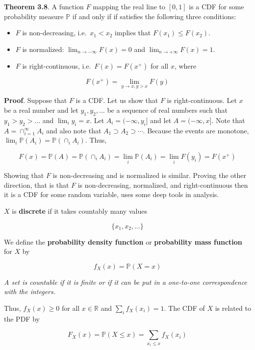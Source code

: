 \textbf{Theorem 3.8}. A function \(F\) mapping the real line to
\([0, 1]\) is a CDF for some probability measure \(\mathbb{P}\) if and
only if if satisfies the following three conditions:

\begin{itemize}[tightlist]
\item
  \(F\) is non-decreasing, i.e.~\(x_1 < x_2\) implies that
  \(F(x_1) \leq F(x_2)\).
\item
  \(F\) is normalized: \(\lim_{n \rightarrow -\infty} F(x) = 0\) and
  \(\lim_{n \rightarrow +\infty} F(x) = 1\).
\item
  \(F\) is right-continuous, i.e.~\(F(x) = F(x^+)\) for all \(x\), where
\end{itemize}

\[ F(x^+) = \lim_{y \rightarrow x, y > x} F(y) \]

\textbf{Proof}. Suppose that \(F\) is a CDF. Let us show that \(F\) is
right-continuous. Let \(x\) be a real number and let \(y_1, y_2, \dots\)
be a sequence of real numbers such that \(y_1 > y_2 > \dots\) and
\(\lim_i y_i = x\). Let \(A_i = (-\infty, y_i]\) and let
\(A = (-\infty, x]\). Note that \(A = \cap_{i=1}^\infty A_i\) and also
note that \(A_1 \supset A_2 \supset \cdots\). Because the events are
monotone, \(\lim_i \mathbb{P}(A_i) = \mathbb{P}(\cap_i A_i)\). Thus,

\[ F(x) = \mathbb{P}(A) = \mathbb{P}(\cap_i A_i) = \lim_i \mathbb{P}(A_i) = \lim_i F(y_i) = F(x^+) \]

Showing that \(F\) is non-decreasing and is normalized is similar.
Proving the other direction, that is that \(F\) is non-decreasing,
normalized, and right-continuous then it is a CDF for some random
variable, uses some deep tools in analysis.

\(X\) is \textbf{discrete} if it takes countably many values

\[ \{ x_1, x_2, \dots \} \]

We define the \textbf{probability density function} or
\textbf{probability mass function} for \(X\) by

\[ f_X(x) = \mathbb{P}(X = x) \]

\emph{A set is countable if it is finite or if it can be put in a
one-to-one correspondence with the integers.}

Thus, \(f_X(x) \geq 0\) for all \(x \in \mathbb{R}\) and
\(\sum_i f_X(x_i) = 1\). The CDF of \(X\) is related to the PDF by

\[ F_X(x) = \mathbb{P}(X \leq x) = \sum_{x_i \leq x} f_X(x_i) \]

